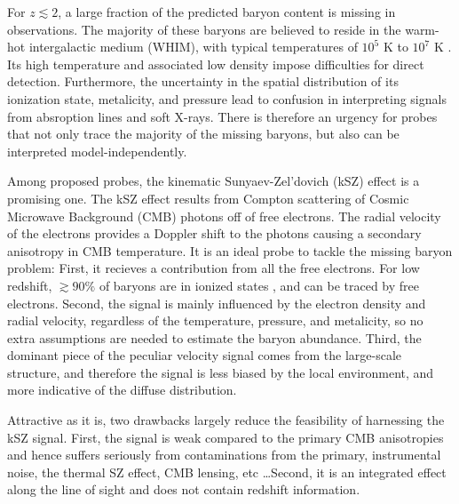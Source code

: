 For $z\lesssim 2$, a large fraction of the predicted baryon content is missing in observations. The majority of these baryons are believed to reside in the warm-hot intergalactic medium (WHIM), with typical temperatures of $10^5$ K to $10^7$ K \cite{Pen1999,Soltan06}. Its high temperature and associated low density impose difficulties for direct detection. Furthermore, the uncertainty in the spatial distribution of its ionization state, metalicity, and pressure lead to confusion in interpreting signals from absroption lines and soft X-rays. There is therefore an urgency for probes that not only trace the majority of the missing baryons, but also can be interpreted model-independently.

Among proposed probes, the kinematic Sunyaev-Zel'dovich (kSZ) effect \cite{Sunyaev72,Sunyaev80,Vishniac87} is a promising one. The kSZ effect results from Compton scattering of Cosmic Microwave Background (CMB) photons off of free electrons. The radial velocity of the electrons provides a Doppler shift to the photons causing a secondary anisotropy in CMB temperature. 
It is an ideal probe to tackle the missing baryon problem: First, it recieves a contribution from all the free electrons. 
For low redshift, $\gtrsim 90\%$ of baryons are in ionized states \cite{Fukugita04}, 
and can be traced by free electrons. %
%
Second, the signal is mainly influenced by the electron density and radial velocity, regardless of the temperature, pressure, and metalicity, so no extra assumptions are needed to estimate the baryon abundance. Third, the dominant piece of the peculiar velocity signal comes from the large-scale structure, and therefore the signal is less biased by the local environment, and more indicative of the diffuse distribution.

Attractive as it is, two drawbacks largely reduce the feasibility of harnessing the kSZ signal. First, the signal is weak compared to the primary CMB anisotropies and hence suffers seriously from contaminations from the primary, instrumental noise, the thermal SZ effect, CMB lensing, etc \dots Second, it is an integrated effect along the line of sight and does not contain redshift information.

